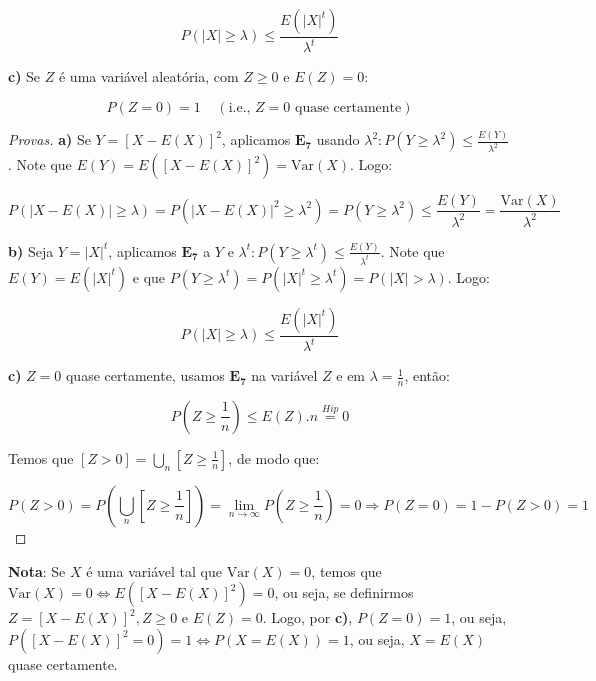 \documentclass[
]{article}
\theoremstyle{definition}
\theoremstyle{definition}
\theoremstyle{definition}
\theoremstyle{definition}
\theoremstyle{remark}
\begin{document}
\begin{equation}
P(|X| \ge \lambda) \le \frac{E\left(|X|^{t}\right)}{\lambda^{t}}
\label{eq:desigmarkov}
\end{equation}

\textbf{c)} Se \(Z\) é uma variável aleatória, com \(Z \ge 0\) e \(E(Z) = 0\):

\begin{equation*}
P(Z=0) = 1 \;\;\;\;(\text{i.e., }Z=0\text{ quase certamente})
\end{equation*}

\begin{proof}[Provas]
\textbf{a)} Se \(Y = [X - E(X)]^{2}\), aplicamos \(\mathbf{E_{7}}\) usando \(\lambda^{2}: P(Y \ge \lambda^{2}) \le \frac{E(Y)}{\lambda^{2}}\). Note que \(E(Y) = E([X - E(X)]^{2}) = \mathrm{Var}(X)\). Logo:

\begin{equation*}
P\left(|X - E(X)| \ge \lambda\right) = P(|X - E(X)|^{2} \ge \lambda^{2}) = P(Y \ge \lambda^{2}) \le \frac{E(Y)}{\lambda^{2}} = \frac{\mathrm{Var}(X)}{\lambda^{2}}
\end{equation*}

\textbf{b)} Seja \(Y = |X|^{t}\), aplicamos \(\mathbf{E_{7}}\) a \(Y\) e \(\lambda^{t}: P(Y \ge \lambda^{t}) \le \frac{E(Y)}{\lambda^{t}}\). Note que \(E(Y) = E(|X|^{t})\) e que \(P(Y \ge \lambda^{t}) = P(|X|^{t} \ge \lambda^{t}) = P(|X| > \lambda)\). Logo:

\begin{equation*}
P(|X| \ge \lambda) \le \frac{E(|X|^{t})}{\lambda^{t}}
\end{equation*}

\textbf{c)} \(Z = 0\) quase certamente, usamos \(\mathbf{E_{7}}\) na variável \(Z\) e em \(\lambda = \frac{1}{n}\), então:

\begin{equation*}
P\left(Z \ge \frac{1}{n}\right) \le E(Z).n \stackrel{Hip}{=}0
\end{equation*}

Temos que \([Z > 0] = \bigcup_{n}\left[Z \ge \frac{1}{n}\right]\), de modo que:

\begin{equation*}
P(Z > 0) = P\left(\bigcup_{n}\left[Z \ge \frac{1}{n}\right]\right) = \lim_{n \to \infty}P\left(Z \ge \frac{1}{n}\right) = 0 \Rightarrow P(Z = 0) = 1 - P(Z > 0) = 1
\end{equation*}
\end{proof}

\textbf{Nota}: Se \(X\) é uma variável tal que \(\mathrm{Var}(X) = 0\), temos que \(\mathrm{Var}(X) = 0 \Leftrightarrow E([X - E(X)]^{2}) = 0\), ou seja, se definirmos \(Z = [X - E(X)]^{2}, Z \ge 0\) e \(E(Z) = 0\). Logo, por \textbf{c)}, \(P(Z = 0) = 1\), ou seja, \(P([X - E(X)]^{2} = 0) = 1 \Leftrightarrow P(X = E(X)) = 1\), ou seja, \(X = E(X)\) quase certamente.
\end{document}
